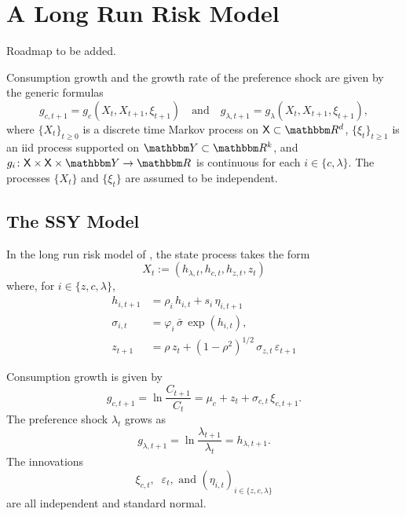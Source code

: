 \documentclass[12pt, reqno]{amsart}
\renewcommand{\geq}{\geqslant}
\newcommand{\1}{\mathbbm 1}
\newcommand{\RR}{\mathbbm R}
\newcommand{\YY}{\mathbbm Y}
\newcommand{\XX}{\mathsf X}
\renewcommand{\phi}{\varphi}
\renewcommand{\epsilon}{\varepsilon}
\theoremstyle{plain}
\theoremstyle{definition}
\begin{document}
\section{A Long Run Risk Model}

Roadmap to be added.

Consumption growth and the growth rate of the preference shock are given by
the generic formulas
%
\begin{equation}
    \label{eq:kappa}
    g_{c, t+1}
    = g_c(X_t, X_{t+1}, \xi_{t+1})
    \quad \text{and} \quad
    g_{\lambda, t+1}
    = g_\lambda(X_t, X_{t+1}, \xi_{t+1}),
\end{equation}
%
where $\{ X_t \}_{t \geq 0}$ is a discrete time Markov process on $\XX \subset \RR^d$, $\{
\xi_t \}_{t \geq 1}$ is an {\sc iid} process supported on $\YY \subset \RR^k$,
and $g_i \colon \XX \times \XX \times \YY \to \RR$ is continuous for
each $i \in \{c, \lambda\}$.  The processes $\{X_t\}$  and $\{\xi_t\}$ are
assumed to be independent.



\subsection{The SSY Model}

In the long run risk model of \cite{schorfheide2018identifying}, the state
process takes the form 
%
\begin{equation*}
    X_t := (h_{\lambda, t}, h_{c, t}, h_{z, t}, z_t)  
\end{equation*}
%
where, for $i \in \{z, c, \lambda\}$,
%
\begin{align*}
    h_{i, t+1}
        & = \rho_i \, h_{i,t} + s_{i} \, \eta_{i, t+1}
        \\
    \sigma_{i,t} 
        & = \phi_i \, \bar{\sigma} \, \exp(h_{i,t}),
        \\
    z_{t+1} 
        & = \rho \, z_t + (1 - \rho^2)^{1/2} \, 
                \sigma_{z, t} \, \epsilon_{t+1}
\end{align*}
%


Consumption growth is given by 
%
\begin{equation}\label{eq:ssygc}
    g_{c, t+1}
    = \ln \frac{C_{t+1}}{C_t} 
    = \mu_c + z_t + \sigma_{c, t} \, \xi_{c, t+1} .
\end{equation}
%
The preference shock $\lambda_t$ grows as
%
\begin{equation*}
    g_{\lambda, t+1}
    = \ln \frac{\lambda_{t+1}}{\lambda_t} 
    = h_{\lambda, t+1}.
\end{equation*}
%
The innovations 
%
\begin{equation*}
    \xi_{c, t}, \;\;  \epsilon_t, \text{ and } (\eta_{i, t})_{i \in \{z, c, \lambda\}}
\end{equation*}
%
are all independent and standard normal.  
\end{document}
